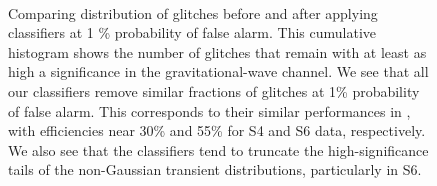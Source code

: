 \documentclass[prd, twocolumn, lengthcheck, superscriptaddress, showpacs, letterpaper, nofootinbib]{revtex4-1}
\begin{document}
\begin{figure}
\centering
{}\\
\caption{Comparing distribution of glitches before and after applying classifiers at 1 \% probability of false alarm. This cumulative histogram shows the number of glitches that remain with at least as high a significance in the gravitational-wave channel. We see that all our classifiers remove similar fractions of glitches at 1\% probability of false alarm. This corresponds to their similar performances in , with efficiencies near 30\% and 55\% for S4 and S6 data, respectively. We also see that the classifiers tend to truncate the high-significance tails of the non-Gaussian transient distributions, particularly in S6.}
\label{fig:hist_signif}
\end{figure}

\end{document}
